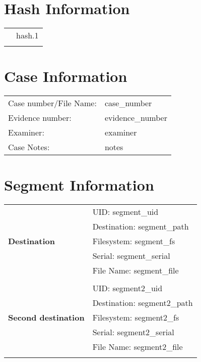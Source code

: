 \documentclass[a4paper,10pt]{article}
\begin{document}
\vspace{0.2em}
\section*{Hash Information}
\begin{tabular}{@{}ll}
{%
{{ hash.0 }}: & {{ hash.1 }} \\
{%
\end{tabular}


\section*{Case Information}
\vspace{-0.7em}
\begin{tabular}{@{}ll}
Case number/File Name: & {{ case_number }} \\
Evidence number: & {{ evidence_number }} \\
Examiner: & {{ examiner }} \\
Case Notes: & {{ notes }} \\
\end{tabular}


\section*{Segment Information}
\vspace{-0.7em}
\begin{tabular}{@{}l p{7cm}}
    \multirow{5}{*}{\textbf{Destination}} 
        & UID:         \hspace{1em} {{ segment_uid }} \\
    & Destination:    \hspace{1em} {{ segment_path }} \\
    & Filesystem:     \hspace{1em} {{ segment_fs }} \\
    & Serial:         \hspace{1em} {{ segment_serial }} \\
    & File Name:      \hspace{1em} {{ segment_file }} \\
    {%
    \\[-0.5em]
    \multirow{5}{*}{\textbf{Second destination}} 
        & UID:         \hspace{1em} {{ segment2_uid }} \\
    & Destination:    \hspace{1em} {{ segment2_path }} \\
    & Filesystem:     \hspace{1em} {{ segment2_fs }} \\
    & Serial:         \hspace{1em} {{ segment2_serial }} \\
    & File Name:      \hspace{1em} {{ segment2_file }} \\
    {%
\end{tabular}
\end{document}
